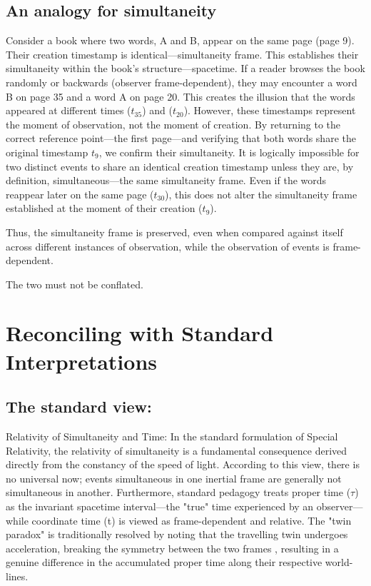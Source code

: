 \documentclass[a4paper,fleqn]{cas-sc}
\begin{document}
	\subsection{An analogy for simultaneity}\label{subsec4_6}
	Consider a book where two words, A and B, appear on the same page (page 9). Their creation timestamp is identical—simultaneity frame. This establishes their simultaneity within the book's structure—spacetime. 
	If a reader browses the book randomly or backwards (observer frame-dependent), they may encounter a word B on page 35 and a word A on page 20. This creates the illusion that the words appeared at different times ($t_{35}$) and ($t_{20}$). However, these timestamps represent the moment of observation, not the moment of creation. By returning to the correct reference point—the first page—and verifying that both words share the original timestamp $t_9$, we confirm their simultaneity. It is logically impossible for two distinct events to share an identical creation timestamp unless they are, by definition, simultaneous—the same simultaneity frame. Even if the words reappear later on the same page ($t_{30}$), this does not alter the simultaneity frame established at the moment of their creation ($t_9$).

Thus, the simultaneity frame is preserved, even when compared against itself across different instances of observation, while the observation of events is frame-dependent.

The two must not be conflated.

\section{Reconciling with Standard Interpretations}\label{sec5}
	\subsection{The standard view:}\label{subsec5_1}
	Relativity of Simultaneity and Time: In the standard formulation of Special Relativity, the relativity of simultaneity is a fundamental consequence derived directly from the constancy of the speed of light. According to this view, there is no universal now; events simultaneous in one inertial frame are generally not simultaneous in another. Furthermore, standard pedagogy treats proper time ($\tau$) as the invariant spacetime interval—the "true" time experienced by an observer—while coordinate time (t) is viewed as frame-dependent and relative. The "twin paradox" is traditionally resolved by noting that the travelling twin undergoes acceleration, breaking the symmetry between the two frames \cite{taylor1992}, resulting in a genuine difference in the accumulated proper time along their respective world-lines.
\end{document}
